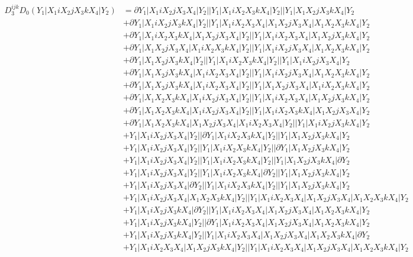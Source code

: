 \documentclass{article}[12pt]
\begin{document}
\begin{align*}
D_3^{ijk}D_0(Y_1|X_1iX_2jX_3kX_4|Y_2)& =\partial Y_1|X_1iX_2jX_3X_4|Y_2||Y_1|X_1iX_2X_3kX_4|Y_2||Y_1|X_1X_2jX_3kX_4|Y_2\\ 
 & +\partial Y_1|X_1iX_2jX_3kX_4|Y_2||Y_1|X_1iX_2X_3X_4|X_1X_2jX_3X_4|X_1X_2X_3kX_4|Y_2\\ 
 & +\partial Y_1|X_1iX_2X_3kX_4|X_1X_2jX_3X_4|Y_2||Y_1|X_1iX_2X_3X_4|X_1X_2jX_3kX_4|Y_2\\ 
 & +\partial Y_1|X_1X_2jX_3X_4|X_1iX_2X_3kX_4|Y_2||Y_1|X_1iX_2jX_3X_4|X_1X_2X_3kX_4|Y_2\\ 
 & +\partial Y_1|X_1X_2jX_3kX_4|Y_2||Y_1|X_1iX_2X_3kX_4|Y_2||Y_1|X_1iX_2jX_3X_4|Y_2\\ 
 & +\partial Y_1|X_1X_2jX_3kX_4|X_1iX_2X_3X_4|Y_2||Y_1|X_1iX_2jX_3X_4|X_1X_2X_3kX_4|Y_2\\ 
 & +\partial Y_1|X_1X_2jX_3kX_4|X_1iX_2X_3X_4|Y_2||Y_1|X_1X_2jX_3X_4|X_1iX_2X_3kX_4|Y_2\\ 
 & +\partial Y_1|X_1X_2X_3kX_4|X_1iX_2jX_3X_4|Y_2||Y_1|X_1iX_2X_3X_4|X_1X_2jX_3kX_4|Y_2\\ 
 & +\partial Y_1|X_1X_2X_3kX_4|X_1iX_2jX_3X_4|Y_2||Y_1|X_1iX_2X_3kX_4|X_1X_2jX_3X_4|Y_2\\ 
 & +\partial Y_1|X_1X_2X_3kX_4|X_1X_2jX_3X_4|X_1iX_2X_3X_4|Y_2||Y_1|X_1iX_2jX_3kX_4|Y_2\\ 
 & +Y_1|X_1iX_2jX_3X_4|Y_2||\partial Y_1|X_1iX_2X_3kX_4|Y_2||Y_1|X_1X_2jX_3kX_4|Y_2\\ 
 & +Y_1|X_1iX_2jX_3X_4|Y_2||Y_1|X_1iX_2X_3kX_4|Y_2||\partial Y_1|X_1X_2jX_3kX_4|Y_2\\ 
 & +Y_1|X_1iX_2jX_3X_4|Y_2||Y_1|X_1iX_2X_3kX_4|Y_2||Y_1|X_1X_2jX_3kX_4|\partial Y_2\\ 
 & +Y_1|X_1iX_2jX_3X_4|Y_2||Y_1|X_1iX_2X_3kX_4|\partial Y_2||Y_1|X_1X_2jX_3kX_4|Y_2\\ 
 & +Y_1|X_1iX_2jX_3X_4|\partial Y_2||Y_1|X_1iX_2X_3kX_4|Y_2||Y_1|X_1X_2jX_3kX_4|Y_2\\ 
 & +Y_1|X_1iX_2jX_3X_4|X_1X_2X_3kX_4|Y_2||Y_1|X_1iX_2X_3X_4|X_1X_2jX_3X_4|X_1X_2X_3kX_4|Y_2\\ 
 & +Y_1|X_1iX_2jX_3kX_4|\partial Y_2||Y_1|X_1iX_2X_3X_4|X_1X_2jX_3X_4|X_1X_2X_3kX_4|Y_2\\ 
 & +Y_1|X_1iX_2jX_3kX_4|Y_2||\partial Y_1|X_1iX_2X_3X_4|X_1X_2jX_3X_4|X_1X_2X_3kX_4|Y_2\\ 
 & +Y_1|X_1iX_2jX_3kX_4|Y_2||Y_1|X_1iX_2X_3X_4|X_1X_2jX_3X_4|X_1X_2X_3kX_4|\partial Y_2\\ 
 & +Y_1|X_1iX_2X_3X_4|X_1X_2jX_3kX_4|Y_2||Y_1|X_1iX_2X_3X_4|X_1X_2jX_3X_4|X_1X_2X_3kX_4|Y_2\\ 

\end{align*}
\end{document}
